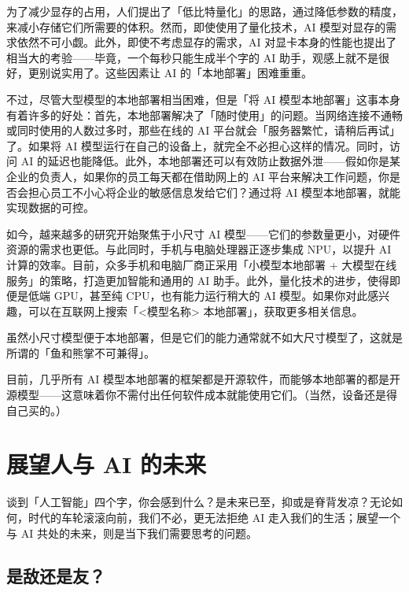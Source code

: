 为了减少显存的占用，人们提出了「低比特量化」的思路，通过降低参数的精度，来减小存储它们所需要的体积。然而，即使使用了量化技术，AI 模型对显存的需求依然不可小觑。此外，即使不考虑显存的需求，AI 对显卡本身的性能也提出了相当大的考验——毕竟，一个每秒只能生成半个字的 AI 助手，观感上就不是很好，更别说实用了。这些因素让 AI 的「本地部署」困难重重。

不过，尽管大型模型的本地部署相当困难，但是「将 AI 模型本地部署」这事本身有着许多的好处：首先，本地部署解决了「随时使用」的问题。当网络连接不通畅或同时使用的人数过多时，那些在线的 AI 平台就会「服务器繁忙，请稍后再试」了。如果将 AI 模型运行在自己的设备上，就完全不必担心这样的情况。同时，访问 AI 的延迟也能降低。此外，本地部署还可以有效防止数据外泄——假如你是某企业的负责人，如果你的员工每天都在借助网上的 AI 平台来解决工作问题，你是否会担心员工不小心将企业的敏感信息发给它们？通过将 AI 模型本地部署，就能实现数据的可控。

如今，越来越多的研究开始聚焦于小尺寸 AI 模型——它们的参数量更小，对硬件资源的需求也更低。与此同时，手机与电脑处理器正逐步集成 NPU，以提升 AI 计算的效率。目前，众多手机和电脑厂商正采用「小模型本地部署 + 大模型在线服务」的策略，打造更加智能和通用的 AI 助手。此外，量化技术的进步，使得即便是低端 GPU，甚至纯 CPU，也有能力运行稍大的 AI 模型。如果你对此感兴趣，可以在互联网上搜索\clearglue{}「<模型名称> 本地部署」\restoreglue{}，获取更多相关信息。

\begin{note}
  虽然小尺寸模型便于本地部署，但是它们的能力通常就不如大尺寸模型了，这就是所谓的「鱼和熊掌不可兼得」。
\end{note}

\begin{dangerbox}
  目前，几乎所有 AI 模型本地部署的框架都是开源软件，而能够本地部署的都是开源模型——这意味着你不需付出任何软件成本就能使用它们。（当然，设备还是得自己买的。）
\end{dangerbox}

\section{展望人与 AI 的未来}

谈到「人工智能」四个字，你会感到什么？是未来已至，抑或是脊背发凉？无论如何，时代的车轮滚滚向前，我们不必，更无法拒绝 AI 走入我们的生活；展望一个与 AI 共处的未来，则是当下我们需要思考的问题。

\subsection{是敌还是友？}

